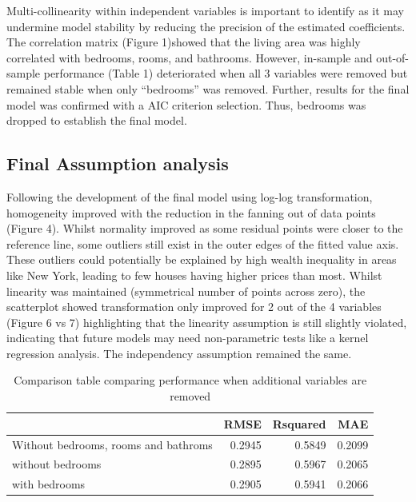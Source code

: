 \documentclass[letterpaper,8pt,twocolumn,twoside,]{pinp}
\begin{document}
Multi-collinearity within independent variables is important to identify
as it may undermine model stability by reducing the precision of the
estimated coefficients. The correlation matrix (Figure 1)showed that the
living area was highly correlated with bedrooms, rooms, and bathrooms.
However, in-sample and out-of-sample performance (Table 1) deteriorated
when all 3 variables were removed but remained stable when only
``bedrooms'' was removed. Further, results for the final model was
confirmed with a AIC criterion selection. Thus, bedrooms was dropped to
establish the final model.

\hypertarget{final-assumption-analysis}{%
\subsection{Final Assumption analysis}\label{final-assumption-analysis}}

Following the development of the final model using log-log
transformation, homogeneity improved with the reduction in the fanning
out of data points (Figure 4). Whilst normality improved as some
residual points were closer to the reference line, some outliers still
exist in the outer edges of the fitted value axis. These outliers could
potentially be explained by high wealth inequality in areas like New
York, leading to few houses having higher prices than most. Whilst
linearity was maintained (symmetrical number of points across zero), the
scatterplot showed transformation only improved for 2 out of the 4
variables (Figure 6 vs 7) highlighting that the linearity assumption is
still slightly violated, indicating that future models may need
non-parametric tests like a kernel regression analysis. The independency
assumption remained the same.

\begin{table}[H]

\caption{\label{tab:unnamed-chunk-3}Comparison table comparing performance when additional variables are removed}
\centering
\begin{tabular}[t]{l|r|r|r}
\hline
  & RMSE & Rsquared & MAE\\
\hline
Without bedrooms, rooms and bathroms & 0.2945 & 0.5849 & 0.2099\\
\hline
without bedrooms & 0.2895 & 0.5967 & 0.2065\\
\hline
with bedrooms & 0.2905 & 0.5941 & 0.2066\\
\hline
\end{tabular}
\end{table}
\end{document}
